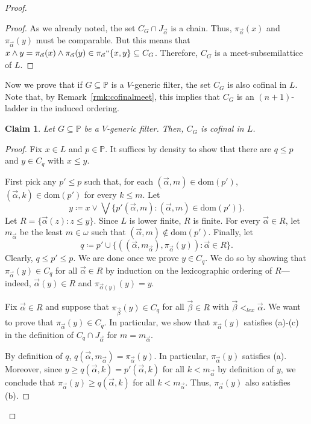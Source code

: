 \documentclass[]{amsart}
\newtheorem{claim}{Claim}[theorem]
\theoremstyle{definition}
\theoremstyle{remark}
\begin{document}
\begin{proof}
\begin{proof}
As we already noted, the set $C_G \cap J_{\vec{\alpha}}$ is a chain. Thus, $\pi_{\vec{\alpha}}(x)$ and $\pi_{\vec{\alpha}}(y)$ must be comparable. But this means that $x \wedge y = \pi_{\vec{\alpha}}(x) \wedge \pi_{\vec{\alpha}}(y) \in \pi_{\vec{\alpha}}``\{x,y\} \subseteq C_G$. Therefore, $C_G$ is a meet-subsemilattice of $L$.
\end{proof}
  
Now we prove that if $G\subseteq \mathbb{P}$ is a $V$-generic filter, the set $C_G$ is also cofinal in $L$. Note that, by Remark~\ref{rmk:cofinalmeet}, this implies that $C_G$ is an $(n+1)$-ladder in the induced ordering.
\begin{claim}
Let $G\subseteq \mathbb{P}$ be a $V$-generic filter. Then, $C_G$ is cofinal in $L$.
\end{claim}
\begin{proof}
Fix $x \in L$ and $p \in \mathbb{P}$. It suffices by density to show that there are $q \le p$ and $y \in C_q$ with $x \le y$.  

First pick any $p' \le p$ such that, for each $(\vec{\alpha}, m) \in \mathrm{dom}(p')$, $(\vec{\alpha}, k) \in \mathrm{dom}(p')$ for every $k \le m$. 
Let
\[
y \coloneqq x \vee \bigvee \big\{p' (\vec{\alpha}, m) : (\vec{\alpha}, m) \in \mathrm{dom}(p')\big\}.
\]
Let $R = \{\vec{\alpha}(z) : z \le y\}$. Since $L$ is lower finite, $R$ is finite. For every $\vec{\alpha} \in R$, let $m_{\vec{\alpha}}$ be the least $m \in\omega$ such that $(\vec{\alpha}, m) \not\in \mathrm{dom}(p')$. Finally, let 
\[
q \coloneqq p' \cup \big\{((\vec{\alpha}, m_{\vec{\alpha}}), \pi_{\vec{\alpha}}(y)) : \vec{\alpha} \in R\big\}.
\]
Clearly, $q \le p' \le p$. We are done once we prove $y \in C_q$.  We do so by showing that $\pi_{\vec{\alpha}}(y) \in C_q$ for all $\vec{\alpha} \in R$ by induction on the lexicographic ordering of $R$---indeed, $\vec{\alpha}(y) \in R$ and $\pi_{\vec{\alpha}(y)}(y) = y$. %

 Fix $\vec{\alpha} \in R$ and suppose that $\pi_{\vec{\beta}} (y) \in C_q$ for all $\vec{\beta} \in R$ with $\vec{\beta} <_{lex} \vec{\alpha}$. We want to prove that $\pi_{\vec{\alpha}} (y) \in C_q$. In particular, we show that $\pi_{\vec{\alpha}} (y)$ satisfies (a)-(c) in the definition of $C_q \cap J_{\vec{\alpha}}$ for $m = m_{\vec{\alpha}}$.
 
 By definition of $q$, $q(\vec{\alpha}, m_{\vec{\alpha}}) = \pi_{\vec{\alpha}}(y)$. In particular, $\pi_{\vec{\alpha}}(y)$ satisfies (a). Moreover, since  $y \ge q(\vec{\alpha}, k) = p'(\vec{\alpha}, k) $ for all $k  < m_{\vec{\alpha}}$ by definition of $y$, we conclude that $\pi_{\vec{\alpha}}(y) \ge q(\vec{\alpha}, k)$ for all $k  < m_{\vec{\alpha}}$. Thus, $\pi_{\vec{\alpha}}(y)$ also satisfies (b). 
 

\end{proof}
\end{proof}
\end{document}
